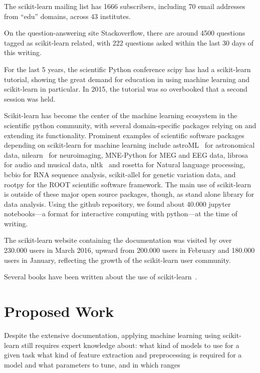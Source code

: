 The scikit-learn mailing list has 1666 subscribers, including 70 email
addresses from ``edu'' domains, across 43 institutes.

On the question-answering site Stackoverflow, there are around 4500 questions
tagged as scikit-learn related, with 222 questions asked within the last 30
days of this writing.

For the last 5 years, the scientific Python conference scipy has had a scikit-learn tutorial,
showing the great demand for education in using machine learning and scikit-learn in particular.
In 2015, the tutorial was so overbooked that a second session was held.

Scikit-learn has become the center of the machine learning ecosystem in the scientific python community,
with several domain-specific packages relying on and extending its functionality.
Prominent examples of scientific software packages depending on scikit-learn
for machine learning include astroML~\cite{van2013openml} for astronomical
data, nilearn~\cite{abraham2014machine} for neuroimaging, MNE-Python for MEG
and EEG data, librosa~\cite{mcfee2015librosa} for audio and musical data,
nltk~\cite{bird2006nltk} and rosetta for Natural language processing, bcbio for
RNA sequence analysis, scikit-allel for genetic variation data, and rootpy for
the ROOT scientific software framework.
The main use of scikit-learn is outside of these major open source packages, though,
as stand alone library for data analysis. Using the github repository, we found
about 40.000 jupyter notebooks---a format for interactive computing with python---at the time of writing.

The scikit-learn website containing the documentation was visited by over
230.000 users in March 2016, upward from 200.000 users in February and 180.000 users in January,
reflecting the growth of the scikit-learn user community.

Several books have been written about the use of scikit-learn~\cite{garreta2013learning, hackeling2014mastering, hauck2014scikit, raschka2015python}.


\section{Proposed Work}
Despite the extensive documentation, applying machine learning using scikit-learn
still requires expert knowledge about:
what kind of models to use for a given task
what kind of feature extraction and preprocessing is required for a model
and what parameters to tune, and in which ranges

